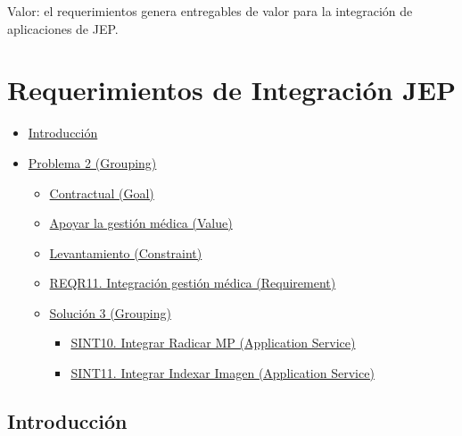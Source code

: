 \documentclass[
  paper=a4,
  ,captions=tableheading
]{scrartcl}
\providecommand{\tightlist}{%
  \setlength{\itemsep}{0pt}\setlength{\parskip}{0pt}}
\begin{document}
Valor: el requerimientos genera entregables de valor para la integración
de aplicaciones de JEP.

\section{Requerimientos de Integración
JEP}\label{sec:requerimientos-de-integraciuxf3n-jep-1}

\begin{itemize}
\tightlist
\item
  \hyperref[Introducciuxf3n]{Introducción}
\item
  \hyperref[problema-2-grouping]{Problema 2 (Grouping)}

  \begin{itemize}
  \tightlist
  \item
    \hyperref[contractual-goal]{Contractual (Goal)}
  \item
    \hyperref[apoyar-la-gestiuxf3n-muxe9dica-value]{Apoyar la gestión
    médica (Value)}
  \item
    \hyperref[levantamiento-constraint]{Levantamiento (Constraint)}
  \item
    \hyperref[-reqr11.-integraciuxf3n-gestiuxf3n-muxe9dica-requirement]{REQR11.
    Integración gestión médica (Requirement)}
  \item
    \hyperref[soluciuxf3n-3-grouping]{Solución 3 (Grouping)}

    \begin{itemize}
    \tightlist
    \item
      \hyperref[sint10.-integrar-radicar-mp-application-service]{SINT10.
      Integrar Radicar MP (Application Service)}
    \item
      \hyperref[sint11.-integrar-indexar-imagen-application-service]{SINT11.
      Integrar Indexar Imagen (Application Service)}
    \end{itemize}
  \end{itemize}
\end{itemize}

\subsection{Introducción}\label{sec:introducciuxf3n-1}
\end{document}
